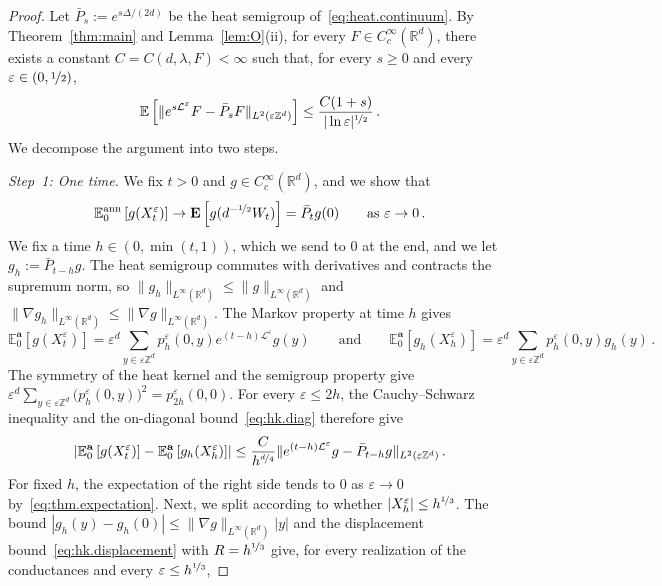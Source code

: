 \documentclass[11pt]{amsart}
\numberwithin{equation}{section}
\newcommand{\Z}{\mathbb{Z}}
\newcommand{\R}{\mathbb{R}}
\newcommand{\E}{\mathbb{E}}
\newcommand{\ba}{\mathbf{a}}
\newcommand{\eps}{\varepsilon}
\newcommand{\Leps}{\mathcal{L}^\varepsilon}
\newcommand{\nf}{\nicefrac}
\begin{document}
\begin{proof}
Let $\bar P_s := e^{s \Delta / (2d)}$ be the heat semigroup of~\eqref{eq:heat.continuum}.
By Theorem~\ref{thm:main} and Lemma~\ref{lem:O}(ii), for every $F \in C^\infty_c(\R^d)$, there exists a constant $C = C(d, \lambda, F) < \infty$ such that, for every $s \geq 0$ and every $\eps \in (0, \nf12)$,
\begin{equation} \label{eq:thm.expectation}
    \E \left[ \| e^{s \Leps} F - \bar P_s F \|_{L^2(\eps \Z^d)} \right] \leq \frac{C (1 + s)}{|\ln \eps|^{\nf12}}\,.
\end{equation}
We decompose the argument into two steps.

\smallskip

\emph{Step~1: One time.}
We fix $t > 0$ and $g \in C^\infty_c(\R^d)$, and we show that
\begin{equation} \label{eq:fdd.k1}
    \E^{\mathrm{ann}}_0 \left[ g(X^\eps_t) \right] \to \mathbf{E} \left[ g(d^{-\nf12} W_t) \right] = \bar P_t g(0) \qquad \text{as } \eps \to 0\,.
\end{equation}
We fix a time $h \in (0, \min(t,1))$, which we send to $0$ at the end, and we let $g_h := \bar P_{t - h} g$.
The heat semigroup commutes with derivatives and contracts the supremum norm, so $\|g_h\|_{L^\infty(\R^d)} \leq \|g\|_{L^\infty(\R^d)}$ and $\|\nabla g_h\|_{L^\infty(\R^d)} \leq \|\nabla g\|_{L^\infty(\R^d)}$.
The Markov property at time $h$ gives
\begin{equation*}
    \E^\ba_0 \left[ g(X^\eps_t) \right] = \eps^d \sum_{y \in \eps \Z^d} p^\eps_h(0, y) e^{(t - h) \Leps} g (y)
    \qquad \text{and} \qquad
    \E^\ba_0 \left[ g_h(X^\eps_h) \right] = \eps^d \sum_{y \in \eps \Z^d} p^\eps_h(0, y) g_h(y)\,.
\end{equation*}
The symmetry of the heat kernel and the semigroup property give $\eps^d \sum_{y \in \eps \Z^d} \bigl( p^\eps_h(0, y) \bigr)^2 = p^\eps_{2h}(0, 0)$.
For every $\eps \leq 2h$, the Cauchy--Schwarz inequality and the on-diagonal bound~\eqref{eq:hk.diag} therefore give
\begin{equation*}
    \left| \E^\ba_0 \left[ g(X^\eps_t) \right] - \E^\ba_0 \left[ g_h(X^\eps_h) \right] \right| \leq \frac{C}{h^{\nf{d}{4}}} \| e^{(t - h) \Leps} g - \bar P_{t - h} g \|_{L^2(\eps \Z^d)}\,.
\end{equation*}
For fixed $h$, the expectation of the right side tends to $0$ as $\eps \to 0$ by~\eqref{eq:thm.expectation}.
Next, we split according to whether $|X^\eps_h| \leq h^{\nf13}$.
The bound $|g_h(y) - g_h(0)| \leq \|\nabla g\|_{L^\infty(\R^d)} |y|$ and the displacement bound~\eqref{eq:hk.displacement} with $R = h^{\nf13}$ give, for every realization of the conductances and every $\eps \leq h^{\nf13}$,

\end{proof}
\end{document}
